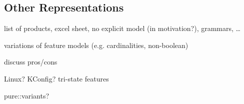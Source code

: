 \subsection{Other Representations}

list of products, excel sheet, no explicit model (in motivation?), grammars, \dots

variations of feature models (e.g. cardinalities, non-boolean)

discuss pros/cons

Linux? KConfig? tri-state features

pure::variants?

